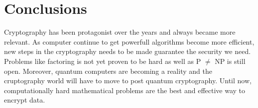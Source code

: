 \chapter{Conclusions}
Cryptography has been protagonist over the years and always became more relevant. As computer continue to get powerfull algorithms become more efficient, new steps in the cryptography needs to be made guarantee the security we need. Problems like factoring is not yet proven to be hard as well as P $\neq$ NP is still open. Moreover, quantum computers are becoming a reality and the cruptography world will have to move to post quantum cryptography. Until now, computationally hard mathematical problems are the best and effective way to encrypt data.
